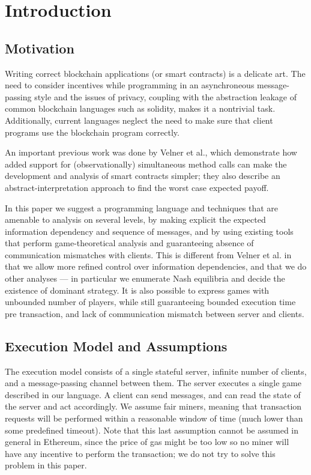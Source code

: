 \documentclass[acmsmall,review,anonymous]{acmart}\settopmatter{printfolios=true,printccs=false,printacmref=false}
\begin{document}
\section{Introduction}

\subsection{Motivation}
Writing correct blockchain applications (or smart contracts) is a delicate art. The need to consider incentives while programming in an asynchroneous message-passing style and the issues of privacy, coupling with the abstraction leakage of common blockchain languages such as solidity, makes it a nontrivial task. Additionally, current languages neglect the need to make sure that client programs use the blockchain program correctly.

An important previous work was done by Velner et al., which demonstrate how added support for (observationally) simultaneous method calls can make the development and analysis of smart contracts simpler; they also describe an abstract-interpretation approach to find the worst case expected payoff.

In this paper we suggest a programming language and techniques that are amenable to analysis on several levels, by making explicit the expected information dependency and sequence of messages, and by using existing tools that perform game-theoretical analysis and guaranteeing absence of communication mismatches with clients. This is different from Velner et al. in that we allow more refined control over information dependencies, and that we do other analyses --- in particular we enumerate Nash equilibria and decide the existence of dominant strategy. It is also possible to express games with unbounded number of players, while still guaranteeing bounded execution time pre transaction, and lack of communication mismatch between server and clients.

\subsection{Execution Model and Assumptions}
The execution model consists of a single stateful server, infinite number of clients, and a message-passing channel between them. The server executes a single game described in our language. A client can send messages, and can read the state of the server and act accordingly. We assume fair miners, meaning that transaction requests will be performed within a reasonable window of time (much lower than some predefined timeout). Note that this last assumption cannot be assumed in general in Ethereum, since the price of gas might be too low so no miner will have any incentive to perform the transaction; we do not try to solve this problem in this paper.
\end{document}
